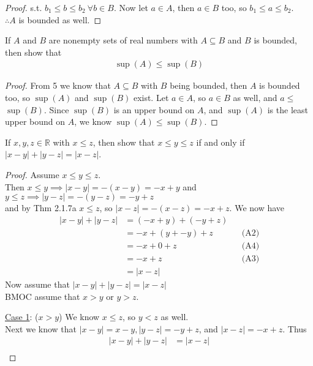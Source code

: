 \documentclass[12pt]{article}
\begin{document}
\begin{enumerate}
\begin{proof}
		      s.t. $b_1 \leq b \leq b_2 \ \forall b \in B$. Now let $a \in A$, then $a \in B$ too, so $b_1 \leq a \leq b_2$. \\
		      $\therefore A$ is bounded as well.
	      \end{proof}
	\item If $A$ and $B$ are nonempty sets of real numbers with $A \subseteq B$ and $B$ is bounded, then show that
	      \begin{gather*}
		      \sup (A) \leq \sup (B)
	      \end{gather*}
	      \begin{proof} From 5 we know that $A \subseteq B$ with $B$ being bounded, then $A$ is bounded too,
		      so $\sup (A)$ and $\sup (B)$ exist. Let $a \in A$, so $a \in B$ as well, and $a \leq$ $\sup (B)$. Since
		      $\sup (B)$ is an upper bound on $A$, and $\sup (A)$ is the least upper bound on $A$, we know $\sup (A) \leq \sup (B)$.
	      \end{proof}
	\item If $x,y,z \in \mathbb{R}$ with $x \leq z$, then show that $x \leq y \leq z$ if and only if $|x-y| + |y-z| = |x-z|$.
	      \begin{proof} Assume $x \leq y \leq z$. \\
		      Then $x \leq y \implies |x-y| = -(x-y) = -x+y$ and\\
		      $y \leq z \implies |y-z| = -(y-z) = -y+z$ \\
		      and by Thm 2.1.7a $x \leq z$, so $|x-z| = -(x-z) = -x+z$. We now have
		      \begin{align*}
			      |x-y|+|y-z| & = (-x+y) + (-y+z)                    \\
			                  & = -x + (y + -y) + z &  & \text{(A2)} \\
			                  & = -x + 0 + z        &  & \text{(A4)} \\
			                  & = -x + z            &  & \text{(A3)} \\
			                  & = |x-z|
		      \end{align*}
		      Now assume that $|x-y| + |y-z| = |x-z|$ \\
		      BMOC assume that $x > y$ or $y > z$.
		      \item[\underline{Case 1}: ($x > y$)] We know $x \leq z$, so $y < z$ as well.\\
		      Next we know that $|x-y| = x-y, |y-z| = -y+z$, and $|x-z| = -x+z$. Thus
		      \begin{align*}
			      |x-y|+|y-z|         & = |x-z|                                       \\

\end{align*}
\end{proof}
\end{enumerate}
\end{document}

